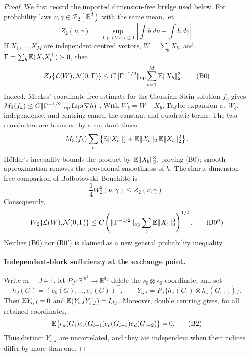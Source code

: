 \begin{proof}
We first record the imported dimension-free bridge used below.  For
probability laws $\nu,\gamma\in\mathcal P_2(\mathbb R^d)$ with the same
mean, let
\[
 Z_2(\nu,\gamma)
 =\sup_{\operatorname{Lip}(\nabla h)\leq1}
   \left|\int h\,d\nu-\int h\,d\gamma\right|.
\]
If $X_1,\ldots,X_M$ are independent centred vectors,
$W=\sum_bX_b$, and
$\Gamma=\sum_b\mathbb E(X_bX_b^\top)\succ0$, then
\[
 Z_2\{\mathcal L(W),\mathcal N(0,\Gamma)\}
 \leq C\|\Gamma^{-1/2}\|_{\rm op}
       \sum_{b=1}^M\mathbb E\|X_b\|_2^3.
 \tag{B0}
\]
Indeed, Meckes' coordinate-free estimate for the Gaussian Stein solution
$f_h$ gives
$M_3(f_h)\leq C\|\Gamma^{-1/2}\|_{\rm op}
\operatorname{Lip}(\nabla h)$
\cite{Meckes2009MultivariateStein}.  With $W_b=W-X_b$, Taylor expansion at
$W_b$, independence, and centring cancel the constant and quadratic terms.
The two remainders are bounded by a constant times
\[
 M_3(f_h)\sum_b
 \left\{\mathbb E\|X_b\|_2^3
 +\mathbb E\|X_b\|_2\,\mathbb E\|X_b\|_2^2\right\}.
\]
H\"older's inequality bounds the product by $\mathbb E\|X_b\|_2^3$, proving
\textup{(B0)}; smooth approximation removes the provisional smoothness of
$h$.  The sharp, dimension-free comparison of
Bo{\l}botowski--Bouchitt\'e is
\cite{BolbotowskiBouchitte2026ZolotarevWasserstein}
\[
 \frac14W_2^2(\nu,\gamma)\leq Z_2(\nu,\gamma).
 \tag{B0$'$}
\]
Consequently,
\[
 W_2\{\mathcal L(W),\mathcal N(0,\Gamma)\}
 \leq C\left(
  \|\Gamma^{-1/2}\|_{\rm op}\sum_b\mathbb E\|X_b\|_2^3
 \right)^{1/2}.
 \tag{B0$''$}
\]
Neither \textup{(B0)} nor \textup{(B0$'$)} is claimed as a new general
probability inequality.

\paragraph{Independent-block sufficiency at the exchange point.}
Write $m=J+1$, let
$P_J:\mathbb R^{m^2}\to\mathbb R^{d_J}$ delete the $e_0\otimes e_0$
coordinate, and set
\[
 h_J(G)=(e_0(G),\ldots,e_J(G))^\top,
 \qquad
 Y_{i,J}=P_J\{h_J(G_i)\otimes h_J(G_{i+1})\}.
 \tag{B1}
\]
Then $\mathbb E Y_{i,J}=0$ and
$\mathbb E(Y_{i,J}Y_{i,J}^\top)=I_{d_J}$.  Moreover, double centring gives, for
all retained coordinates,
\[
 \mathbb E\{e_a(G_i)e_b(G_{i+1})e_c(G_{i+1})e_d(G_{i+2})\}=0.
 \tag{B2}
\]
Thus distinct $Y_{i,J}$ are uncorrelated, and they are independent when their
indices differ by more than one.


\end{proof}
